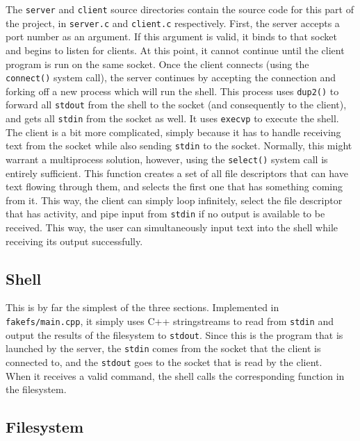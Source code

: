 \documentclass[twoside]{article}
\begin{document}
\begin{multicols}{2}
The \texttt{server} and \texttt{client} source directories contain the source
code for this part of the project, in \texttt{server.c} and \texttt{client.c}
respectively. First, the server accepts a port number as an argument. If this
argument is valid, it binds to that socket and begins to listen for clients. At
this point, it cannot continue until the client program is run on the same
socket. Once the client connects (using the \texttt{connect()} system call), the
server continues by accepting the connection and forking off a new process which
will run the shell. This process uses \texttt{dup2()} to forward all
\texttt{stdout} from the shell to the socket (and consequently to the client),
and gets all \texttt{stdin} from the socket as well. It uses \texttt{execvp} to
execute the shell.
\\
The client is a bit more complicated, simply because it has to handle receiving
text from the socket while also sending \texttt{stdin} to the socket. Normally,
this might warrant a multiprocess solution, however, using the \texttt{select()}
system call is entirely sufficient. This function creates a set of all file
descriptors that can have text flowing through them, and selects the first one
that has something coming from it. This way, the client can simply loop
infinitely, select the file descriptor that has activity, and pipe input from
\texttt{stdin} if no output is available to be received. This way, the user can
simultaneously input text into the shell while receiving its output
successfully.

\subsection{Shell}

This is by far the simplest of the three sections. Implemented in
\texttt{fakefs/main.cpp}, it simply uses C++ stringstreams to read from
\texttt{stdin} and output the results of the filesystem to \texttt{stdout}.
Since this is the program that is launched by the server, the \texttt{stdin}
comes from the socket that the client is connected to, and the \texttt{stdout}
goes to the socket that is read by the client.
\\
When it receives a valid command, the shell calls the corresponding function in
the filesystem.

\subsection{Filesystem}


\end{multicols}
\end{document}
